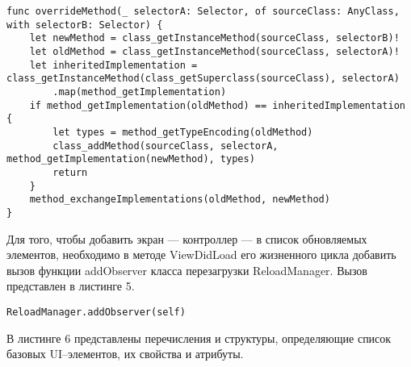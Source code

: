 \begin{lstlisting}[caption={Класс, обеспечивающий перезагрузку по время выполнения}]
func overrideMethod(_ selectorA: Selector, of sourceClass: AnyClass, with selectorB: Selector) {
    let newMethod = class_getInstanceMethod(sourceClass, selectorB)!
    let oldMethod = class_getInstanceMethod(sourceClass, selectorA)!
    let inheritedImplementation = class_getInstanceMethod(class_getSuperclass(sourceClass), selectorA)
        .map(method_getImplementation)
    if method_getImplementation(oldMethod) == inheritedImplementation {
        let types = method_getTypeEncoding(oldMethod)
        class_addMethod(sourceClass, selectorA, method_getImplementation(newMethod), types)
        return
    }
    method_exchangeImplementations(oldMethod, newMethod)
}
\end{lstlisting}

Для того, чтобы добавить экран ---  контроллер --- в список обновляемых элементов, необходимо в методе ViewDidLoad его жизненного цикла добавить вызов функции addObserver класса перезагрузки ReloadManager. 
Вызов представлен в листинге 5.


\begin{lstlisting}[caption={Класс, обеспечивающий перезагрузку по время выполнения}]
ReloadManager.addObserver(self)
\end{lstlisting}

В листинге 6 представлены перечисления и структуры, определяющие список базовых UI--элементов, их свойства и атрибуты.

